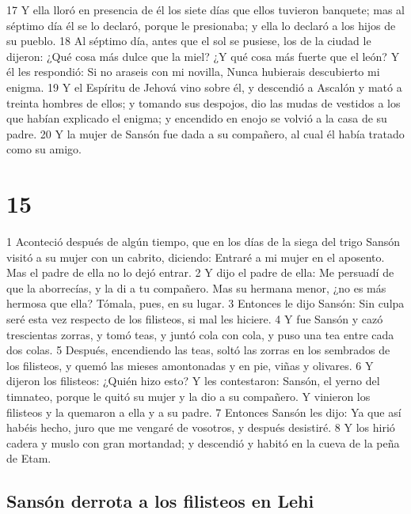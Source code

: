 17 Y ella lloró en presencia de él los siete días que ellos tuvieron banquete; mas al séptimo día él se lo declaró, porque le presionaba; y ella lo declaró a los hijos de su pueblo.
18 Al séptimo día, antes que el sol se pusiese, los de la ciudad le dijeron:
¿Qué cosa más dulce que la miel?
¿Y qué cosa más fuerte que el león?
Y él les respondió:
Si no araseis con mi novilla,
Nunca hubierais descubierto mi enigma.
19 Y el Espíritu de Jehová vino sobre él, y descendió a Ascalón y mató a treinta hombres de ellos; y tomando sus despojos, dio las mudas de vestidos a los que habían explicado el enigma; y encendido en enojo se volvió a la casa de su padre.
20 Y la mujer de Sansón fue dada a su compañero, al cual él había tratado como su amigo.

\chapter{15}

1 Aconteció después de algún tiempo, que en los días de la siega del trigo Sansón visitó a su mujer con un cabrito, diciendo: Entraré a mi mujer en el aposento. Mas el padre de ella no lo dejó entrar.
2 Y dijo el padre de ella: Me persuadí de que la aborrecías, y la di a tu compañero. Mas su hermana menor, ¿no es más hermosa que ella? Tómala, pues, en su lugar.
3 Entonces le dijo Sansón: Sin culpa seré esta vez respecto de los filisteos, si mal les hiciere.
4 Y fue Sansón y cazó trescientas zorras, y tomó teas, y juntó cola con cola, y puso una tea entre cada dos colas.
5 Después, encendiendo las teas, soltó las zorras en los sembrados de los filisteos, y quemó las mieses amontonadas y en pie, viñas y olivares.
6 Y dijeron los filisteos: ¿Quién hizo esto? Y les contestaron: Sansón, el yerno del timnateo, porque le quitó su mujer y la dio a su compañero. Y vinieron los filisteos y la quemaron a ella y a su padre.
7 Entonces Sansón les dijo: Ya que así habéis hecho, juro que me vengaré de vosotros, y después desistiré.
8 Y los hirió cadera y muslo con gran mortandad; y descendió y habitó en la cueva de la peña de Etam.

\section*{Sansón derrota a los filisteos en Lehi}

